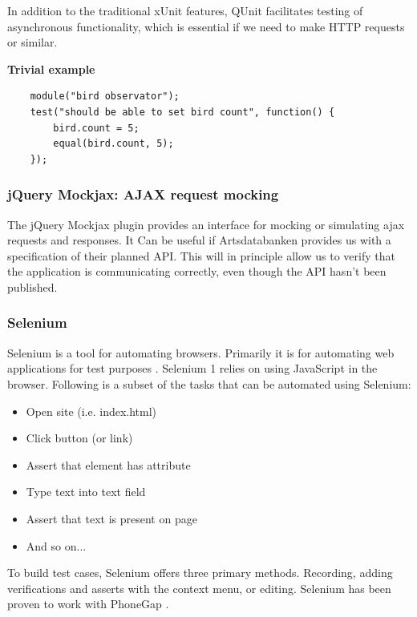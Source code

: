 	In addition to the traditional xUnit features, QUnit facilitates testing of
	asynchronous functionality, which is essential if we need to make HTTP
	requests or similar.

	\textbf{Trivial example}

\begin{lstlisting}
	module("bird observator");
	test("should be able to set bird count", function() {
		bird.count = 5;
		equal(bird.count, 5);
	});
\end{lstlisting}

\subsubsection{jQuery Mockjax: AJAX request mocking}

	The jQuery Mockjax plugin provides an interface for mocking or simulating
	ajax requests and responses. \cite{github:jquery-mockjax}It Can be useful if Artsdatabanken provides us
	with a specification of their planned API. This will in principle allow us
	to verify that the application is communicating correctly, even though the
	API hasn't been published.

\subsubsection{Selenium}

	Selenium is a tool for automating browsers. Primarily it is for automating
	web applications for test purposes \cite{seleniumhq:home}. Selenium 1 relies
	on using JavaScript in the browser. Following is a subset of the tasks that
	can be automated using Selenium:

	\begin{itemize}
		\item Open site (i.e. index.html)
		\item Click button (or link)
		\item Assert that element has attribute
		\item Type text into text field
		\item Assert that text is present on page
		\item And so on...
	\end{itemize}

	To build test cases, Selenium offers three primary methods. Recording, adding
	verifications and asserts with the context menu, or editing. Selenium has
	been proven to work with PhoneGap \cite{phonegap:automatic-test-cases}.


